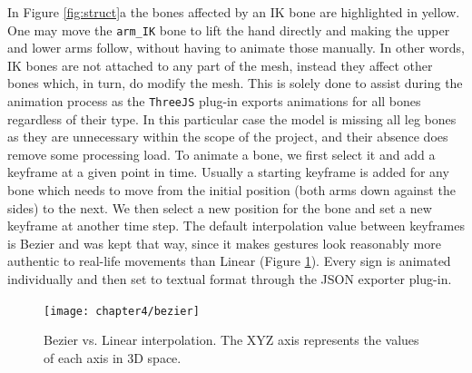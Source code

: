 \documentclass[12pt]{ociamthesis}  %
\begin{document}
In Figure \ref{fig:struct}a the bones affected by an IK bone are highlighted in yellow. One may move the \texttt{arm\_IK} bone to lift the hand directly and making the upper and lower arms follow, without having to animate those manually. In other words, IK bones are not attached to any part of the mesh, instead they affect other bones which, in turn, do modify the mesh. This is solely done to assist during the animation process as the \texttt{ThreeJS} plug-in exports animations for all bones regardless of their type. In this particular case the model is missing all leg bones as they are unnecessary within the scope of the project, and their absence does remove some processing load. To animate a bone, we first select it and add a keyframe at a given point in time. Usually a starting keyframe is added for any bone which needs to move from the initial position (both arms down against the sides) to the next. We then select a new position for the bone and set a new keyframe at another time step. The default interpolation value between keyframes is Bezier and was kept that way, since it makes gestures look reasonably more authentic to real-life movements than Linear (Figure \ref{fig:bezier}). Every sign is animated individually and then set to textual format through the JSON exporter plug-in. 

\begin{figure}[H]
	\centering
    \texttt{[image: chapter4/bezier]}
    \caption[Bezier vs. Linear interpolation]{Bezier vs. Linear interpolation. The XYZ axis represents the values of each axis in 3D space.}
    \label{fig:bezier}
\end{figure}	
\end{document}
